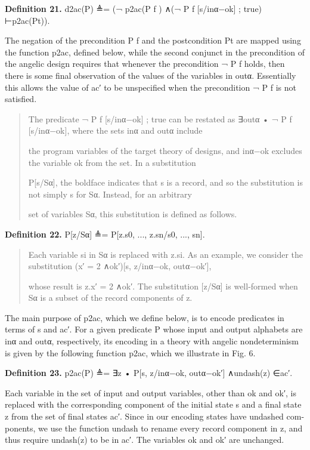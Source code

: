 \documentclass[11pt]{article}
\begin{document}
\noindent\textbf{Definition 21.} d2ac(P) ≜= (¬ p2ac(P f ) ∧(¬ P f [s/inα−ok] ; true) ⊢p2ac(Pt)).


The negation of the precondition P f and the postcondition Pt are mapped using the function p2ac, defined below, while the second conjunct in the precondition of the angelic design requires that whenever the precondition ¬ P f holds, then there is some final observation of the values of the variables in outα. Essentially this allows the value of ac′ to be unspecified when the precondition ¬ P f is not satisfied.

\begin{quote}\small\raggedright
The predicate ¬ P f [s/inα−ok] ; true can be restated as ∃outα • ¬ P f [s/inα−ok], where the sets inα and outα include
\par
the program variables of the target theory of designs, and inα−ok excludes the variable ok from the set. In a substitution
\par
P[s/Sα], the boldface indicates that s is a record, and so the substitution is not simply s for Sα. Instead, for an arbitrary
\par
set of variables Sα, this substitution is defined as follows.
\end{quote}

\noindent\textbf{Definition 22.} P[z/Sα] ≜= P[z.s0, ..., z.sn/s0, ..., sn].


\begin{quote}\small\raggedright
Each variable si in Sα is replaced with z.si. As an example, we consider the substitution (x′ = 2 ∧ok′)[s, z/inα−ok, outα−ok′],
\par
whose result is z.x′ = 2 ∧ok′. The substitution [z/Sα] is well-formed when Sα is a subset of the record components of z.
\end{quote}

The main purpose of p2ac, which we define below, is to encode predicates in terms of s and ac′. For a given predicate P whose input and output alphabets are inα and outα, respectively, its encoding in a theory with angelic nondeterminism is given by the following function p2ac, which we illustrate in Fig. 6.

\noindent\textbf{Definition 23.} p2ac(P) ≜= ∃z • P[s, z/inα−ok, outα−ok′] ∧undash(z) ∈ac′.


Each variable in the set of input and output variables, other than ok and ok′, is replaced with the corresponding component of the initial state s and a final state z from the set of final states ac′. Since in our encoding states have undashed com- ponents, we use the function undash to rename every record component in z, and thus require undash(z) to be in ac′. The variables ok and ok′ are unchanged.
\end{document}
